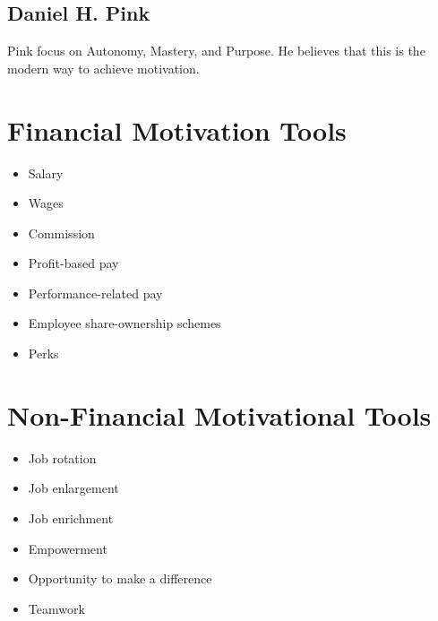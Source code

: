 \documentclass{standalone}
\begin{document}
\subsection{Daniel H. Pink}
Pink focus on Autonomy, Mastery, and Purpose.
He believes that this is the modern way to achieve motivation.

\section{Financial Motivation Tools}
\begin{itemize}
	\item Salary
	\item Wages
	\item Commission
	\item Profit-based pay
	\item Performance-related pay
	\item Employee share-ownership schemes
	\item Perks
\end{itemize}

\section{Non-Financial Motivational Tools}
\begin{itemize}
	\item Job rotation
	\item Job enlargement
	\item Job enrichment
	\item Empowerment
	\item Opportunity to make a difference
	\item Teamwork
\end{itemize}

	
\end{document}
